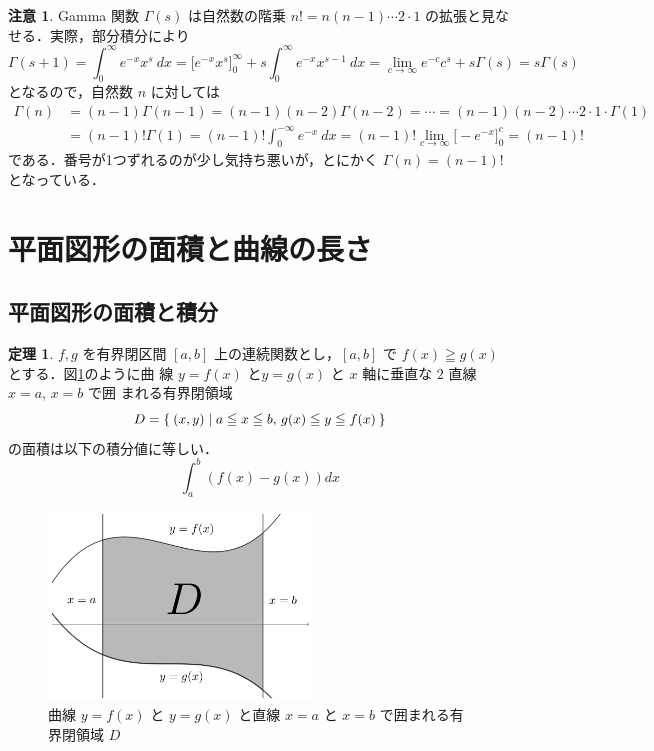 \documentclass[10pt, uplatex, dvipdfmx]{jsarticle}
\theoremstyle{definition}
\newtheorem{theorem}{定理}[section]
\newtheorem*{remark}{注意}
\numberwithin{equation}{section}
\begin{document}
\begin{remark}
  Gamma 関数 $\varGamma(s)$ は自然数の階乗 $n! = n (n-1)\cdots 2 \cdot 1$ の拡張と見なせる．実際，部分積分により
  \[
    \varGamma(s+1) = \int_{0}^{\infty} e^{-x} x^{s} \ dx = \Big[e^{-x}x^{s}\Big]_{0}^{\infty} + s \int_{0}^{\infty} e^{-x} x^{s-1} \ dx
    = \lim_{c \to \infty} e^{-c}c^s + s \varGamma(s) = s\varGamma(s)
  \]
  となるので，自然数 $n$ に対しては
  \[
    \begin{aligned}
      \varGamma(n) &= (n-1) \varGamma(n-1) = (n-1)(n-2) \varGamma(n-2) = \cdots = (n-1)(n-2) \cdots 2 \cdot 1 \cdot \varGamma(1)\\
                   & = (n-1)! \varGamma(1) = (n-1)! \int_{0}^{-\infty} e^{-x} \ dx  = (n-1)! \lim_{c \to \infty} \Big[-e^{-x}\Big]_{0}^{c}
                     = (n-1)!
    \end{aligned}
  \]
  である．番号が1つずれるのが少し気持ち悪いが，とにかく $\Gamma(n) = (n-1)!$ となっている．
\end{remark}

\newpage


\section{平面図形の面積と曲線の長さ}\label{sec:area}


\subsection{平面図形の面積と積分}

\begin{theorem}\label{thm:area}
  $f,g$ を有界閉区間 $[a,b]$ 上の連続関数とし，$[a,b]$ で $f(x) \geqq
  g(x)$ とする．図\ref{fig:area}のように曲
  線 $y=f(x)$ と$y=g(x)$ と $x$ 軸に垂直な $2$ 直線 $x=a, \, x=b$ で囲
  まれる有界閉領域
  \[
    D=\Set{(x,y) | a \leqq x \leqq b, \, g(x) \leqq y \leqq f(x)}
  \]
  の面積は以下の積分値に等しい．
  \[
    \int_{a}^{b} \left( f(x) - g(x) \right) dx
  \]
  \begin{figure}[h]
    \centering
    \includegraphics[width=7cm]{./pictures/05/area.pdf}
    \caption{曲線 $y=f(x)$ と $y=g(x)$ と直線 $x=a$ と $x=b$ で囲まれる有界閉領域 $D$}
    \label{fig:area}
  \end{figure}
\end{theorem}
\end{document}
